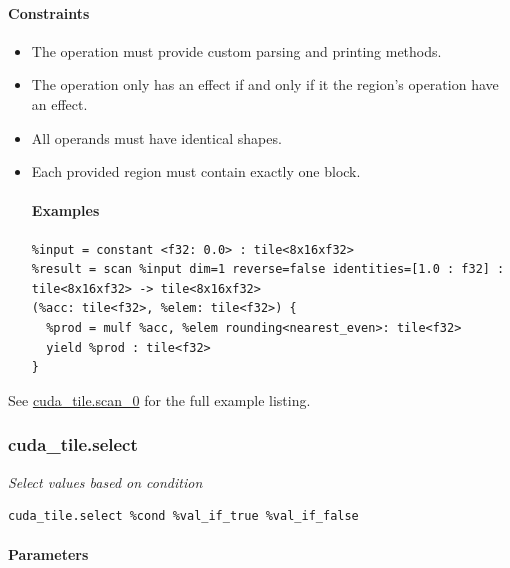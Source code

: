 \documentclass{article}
\begin{document}
\paragraph{Constraints}

\begin{itemize}
\item The operation must provide custom parsing and printing methods.
\item The operation only has an effect if and only if it the region's operation have an effect.
\item All operands must have identical shapes.
\item Each provided region must contain exactly one block.


\paragraph{Examples}

\begin{lstlisting}
%input = constant <f32: 0.0> : tile<8x16xf32>
%result = scan %input dim=1 reverse=false identities=[1.0 : f32] : tile<8x16xf32> -> tile<8x16xf32>
(%acc: tile<f32>, %elem: tile<f32>) {
  %prod = mulf %acc, %elem rounding<nearest_even>: tile<f32>
  yield %prod : tile<f32>
}
\end{lstlisting}

\end{itemize}
See \href{https://docs.nvidia.com/cuda/tile-ir/latest/sections/appendix.html#example-cuda-tile-scan-0}{cuda\_tile.scan\_0} for the full example listing.



\subsubsection{cuda\_tile.select}

\textit{Select values based on condition}


\begin{lstlisting}
cuda_tile.select %cond %val_if_true %val_if_false
\end{lstlisting}

\paragraph{Parameters}
\end{document}
